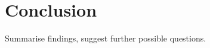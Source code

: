 \chapter{Conclusion}\label{ch:conclusion}
    Summarise findings, suggest further possible questions.
